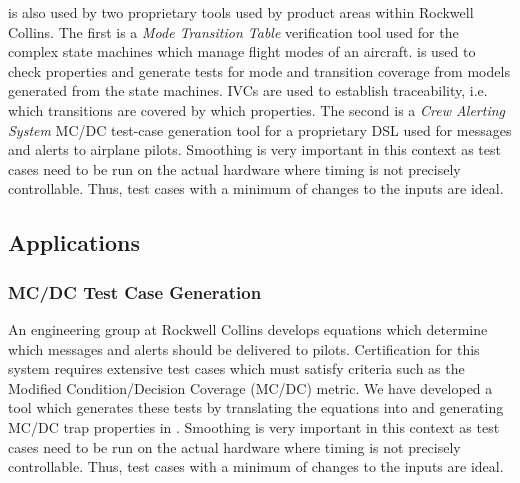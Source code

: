 \jkind is also used by two proprietary tools used by product areas within Rockwell Collins.  The first is a {\em Mode Transition Table} verification tool used for the complex state machines which manage flight modes of an aircraft.
\jkind is used to check properties and generate tests for mode and transition coverage from \lustre models generated from the state machines.
IVCs are used to establish traceability, i.e. which transitions are covered by which properties.  The second is a {\em Crew Alerting System} MC/DC test-case generation tool for a proprietary DSL used for messages and alerts to airplane pilots.  Smoothing is very important in this context as test cases need to be run on the actual hardware where
timing is not precisely controllable. Thus, test cases with a minimum
of changes to the inputs are ideal.
%
%

\subsection{Applications}

\subsubsection{MC/DC Test Case Generation}

An engineering group at Rockwell Collins develops equations
which determine which messages and alerts should be delivered to
pilots. Certification for this system requires extensive test cases
which must satisfy criteria such as the Modified Condition/Decision
Coverage (MC/DC) metric. We have developed a tool which generates
these tests by translating the equations into \lustre and generating
MC/DC trap properties in \jkind. Smoothing is very important in this
context as test cases need to be run on the actual hardware where
timing is not precisely controllable. Thus, test cases with a minimum
of changes to the inputs are ideal.

